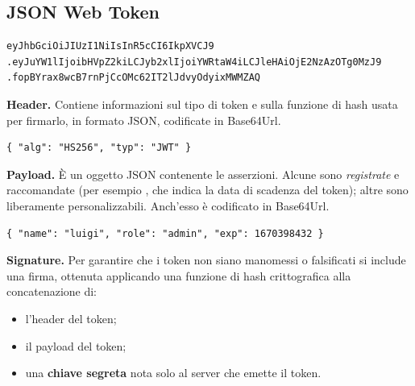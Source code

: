 \subsection{JSON Web Token}


\begin{lstlisting}[style=plain, name=Un token JWT]
eyJhbGciOiJIUzI1NiIsInR5cCI6IkpXVCJ9
.eyJuYW1lIjoibHVpZ2kiLCJyb2xlIjoiYWRtaW4iLCJleHAiOjE2NzAzOTg0MzJ9
.fopBYrax8wcB7rnPjCcOMc62IT2lJdvyOdyixMWMZAQ
\end{lstlisting}

\textbf{Header.} Contiene informazioni sul tipo di token e sulla funzione di
hash usata per firmarlo, in formato JSON, codificate in Base64Url.

\begin{lstlisting}[style=json]
{ "alg": "HS256", "typ": "JWT" }
\end{lstlisting}

\textbf{Payload.} È un oggetto JSON contenente le asserzioni. Alcune sono
\textit{registrate} e raccomandate (per esempio , che indica la data
di scadenza del token); altre sono liberamente personalizzabili. Anch'esso è
codificato in Base64Url.

\begin{lstlisting}[style=json]
{ "name": "luigi", "role": "admin", "exp": 1670398432 }
\end{lstlisting}


\textbf{Signature.} Per garantire che i token non siano manomessi o falsificati
si include una firma, ottenuta applicando una funzione di hash crittografica
alla concatenazione di:

\begin{itemize}
  \item l'header del token;
  \item il payload del token;
  \item una \textbf{chiave segreta} nota solo al server che emette il token.
\end{itemize}

